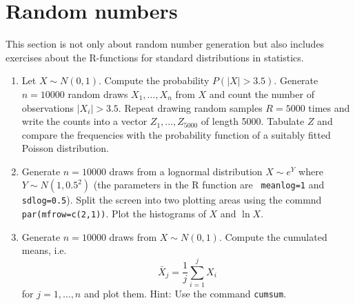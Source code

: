 \documentclass{article}
\begin{document}
\section{Random numbers}

This section is not only about random number generation but also includes
exercises about the R-functions for standard distributions in statistics.

\begin{enumerate}
\item Let $X\sim N\left( 0,1\right) $. Compute the probability $P(|X|>3.5)$.
Generate $n=10000$ random draws $X_{1},\ldots ,X_{n}$ from $X$ and count the
number of observations $|X_{i}|>3.5$. Repeat drawing random samples $R=5000$
times and write the counts into a vector $Z_{1},\ldots ,Z_{5000}$ of length
5000. Tabulate $Z$ and compare the frequencies with the probability function
of a suitably fitted Poisson distribution.

\item Generate $n=10000$ draws from a lognormal distribution $X\sim e^{Y}$
where $Y\sim N(1,0.5^{2})$ (the parameters in the R function are \texttt{%
meanlog=1} and \texttt{sdlog=0.5}). Split the screen into two plotting areas
using the commnd \texttt{par(mfrow=c(2,1))}. Plot the histograms of $X$ and $%
\ln X$.

\item Generate $n=10000$ draws from $X\sim N(0,1)$. Compute the cumulated
means, i.e.%
\begin{equation*}
\bar{X}_{j}=\frac{1}{j}\sum_{i=1}^{j}X_{i}
\end{equation*}%
for $j=1,\ldots ,n$ and plot them. Hint: Use the command \texttt{cumsum}.


\end{enumerate}
\end{document}
